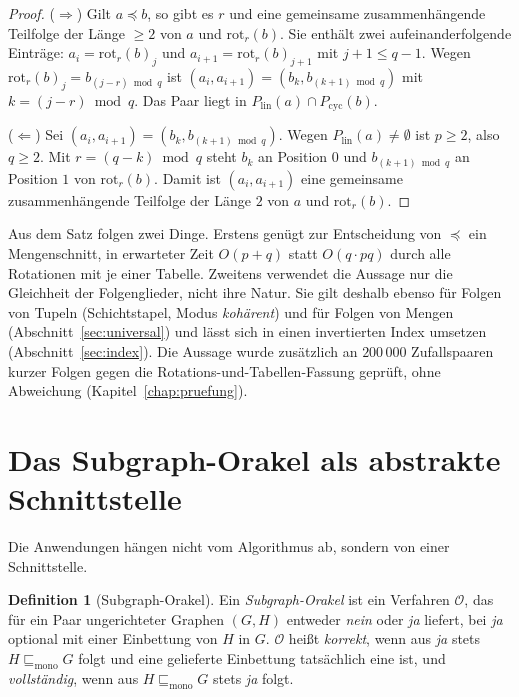 \documentclass[a4paper,12pt,twoside]{report}
\DeclareRobustCommand{\_}{\textunderscore\allowbreak{}}
\theoremstyle{definition}
\newtheorem{definition}{Definition}[chapter]
\begin{document}
\begin{proof}
	($\Rightarrow$) Gilt $a\preceq b$, so gibt es $r$ und eine gemeinsame zusammenhängende Teilfolge der Länge $\ge 2$ von $a$ und $\mathrm{rot}_r(b)$. Sie enthält zwei aufeinanderfolgende Einträge: $a_i=\mathrm{rot}_r(b)_j$ und $a_{i+1}=\mathrm{rot}_r(b)_{j+1}$ mit $j+1\le q-1$. Wegen $\mathrm{rot}_r(b)_j=b_{(j-r)\bmod q}$ ist $(a_i,a_{i+1})=(b_k,b_{(k+1)\bmod q})$ mit $k=(j-r)\bmod q$. Das Paar liegt in $P_{\mathrm{lin}}(a)\cap P_{\mathrm{cyc}}(b)$.
 
	($\Leftarrow$) Sei $(a_i,a_{i+1})=(b_k,b_{(k+1)\bmod q})$. Wegen $P_{\mathrm{lin}}(a)\ne\emptyset$ ist $p\ge2$, also $q\ge 2$. Mit $r=(q-k)\bmod q$ steht $b_k$ an Position $0$ und $b_{(k+1)\bmod q}$ an Position $1$ von $\mathrm{rot}_r(b)$. Damit ist $(a_i,a_{i+1})$ eine gemeinsame zusammenhängende Teilfolge der Länge $2$ von $a$ und $\mathrm{rot}_r(b)$.
\end{proof}
 
Aus dem Satz folgen zwei Dinge. Erstens genügt zur Entscheidung von $\preceq$ ein Mengenschnitt, in erwarteter Zeit $O(p+q)$ statt $O(q\cdot pq)$ durch alle Rotationen mit je einer Tabelle. Zweitens verwendet die Aussage nur die Gleichheit der Folgenglieder, nicht ihre Natur. Sie gilt deshalb ebenso für Folgen von Tupeln (Schichtstapel, Modus \emph{kohärent}) und für Folgen von Mengen (Abschnitt~\ref{sec:universal}) und lässt sich in einen invertierten Index umsetzen (Abschnitt~\ref{sec:index}). Die Aussage wurde zusätzlich an $200\,000$ Zufallspaaren kurzer Folgen gegen die Rotations-und-Tabellen-Fassung geprüft, ohne Abweichung (Kapitel~\ref{chap:pruefung}).
 
\section{Das Subgraph-Orakel als abstrakte Schnittstelle}
 
Die Anwendungen hängen nicht vom Algorithmus ab, sondern von einer Schnittstelle.
 
\begin{definition}[Subgraph-Orakel]
	\label{def:orakel}
	Ein \emph{Subgraph-Orakel} ist ein Verfahren $\mathcal{O}$, das für ein Paar ungerichteter Graphen $(G,H)$ entweder \emph{nein} oder \emph{ja} liefert, bei \emph{ja} optional mit einer Einbettung von $H$ in $G$. $\mathcal{O}$ heißt \emph{korrekt}, wenn aus \emph{ja} stets $H\sqsubseteq_{\mathrm{mono}}G$ folgt und eine gelieferte Einbettung tatsächlich eine ist, und \emph{vollständig}, wenn aus $H\sqsubseteq_{\mathrm{mono}}G$ stets \emph{ja} folgt.
\end{definition}
 
\end{document}
